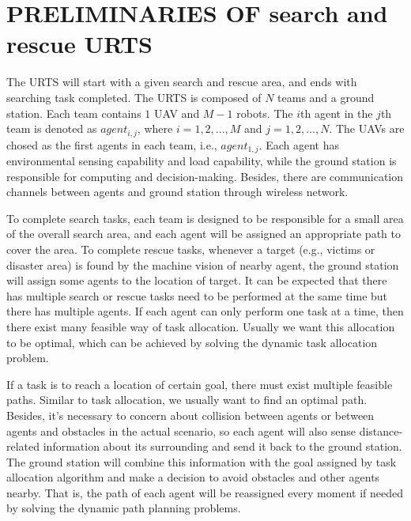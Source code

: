 \documentclass{ieeeaccess}
\begin{document}
\section{PRELIMINARIES OF search and rescue URTS}
The URTS will start with a given search and rescue area, and ends with searching task completed. The URTS is composed of $N$ teams and a ground station. Each team contains $1$ UAV and $M-1$ robots. The $i$th agent in the $j$th team is denoted as $agent_{i,j}$, where $i=1,2,...,M$ and $j=1,2,...,N$. The UAVs are chosed as the first agents in each team, i.e., $agent_{1,j}$. Each agent has environmental sensing capability and load capability, while the ground station is responsible for computing and decision-making. Besides, there are communication channels between agents and ground station through wireless network.

To complete search tasks, each team is designed to be responsible for a small area of the overall search area, and each agent will be assigned an appropriate path to cover the area. To complete rescue tasks, whenever a target (e.g., victims or disaster area) is found by the machine vision of nearby agent, the ground station will assign some agents to the location of target. It can be expected that there has multiple search or rescue tasks need to be performed at the same time but there has multiple agents. If each agent can only perform one task at a time, then there exist many feasible way of task allocation. Usually we want this allocation to be optimal, which can be achieved by solving the dynamic task allocation problem.

If a task is to reach a location of certain goal, there must exist multiple feasible paths. Similar to task allocation, we usually want to find an optimal path. Besides, it's necessary to concern about collision between agents or between agents and obstacles in the actual scenario, so each agent will also sense distance-related information about its surrounding and send it back to the ground station. The ground station will combine this information with the goal assigned by task allocation algorithm and make a decision to avoid obstacles and other agents nearby. That is, the path of each agent will be reassigned every moment if needed by solving the dynamic path planning problems.
\end{document}
